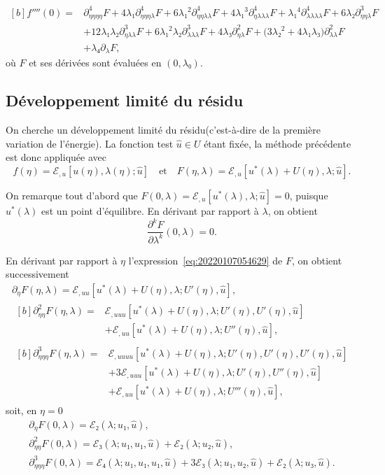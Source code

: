 \documentclass[12pt, final]{amsart}
\theoremstyle{definition}
\begin{document}
\begin{equation}
  \begin{aligned}[b]
    f''''(0) ={}
    & ∂_{ηηηη}^4F + 4 λ₁ ∂_{ηηηλ}^4 F + 6 λ₁^2 ∂_{ηηλλ}^4 F + 4 λ₁^3 ∂_{ηλλλ}^4 F + λ₁^4 ∂_{λλλλ}^4 F + 6 λ₂ ∂_{ηηλ}^3 F\\
    & + 12 λ₁ λ₂ ∂_{ηλλ}^3 F + 6 λ₁^2 λ₂ ∂_{λλλ}^3 F + 4 λ₃ ∂_{ηλ}^2 F + \bigl(3 λ₂^2 + 4 λ₁ λ₃\bigr) ∂_{λλ}^2 F \\
    & + λ₄ ∂_{λ} F,
  \end{aligned}
\end{equation}
où \(F\) et ses dérivées sont évaluées en \((0, λ₀)\).

\subsection{Développement limité du résidu}
\label{sec:20211112182000}

On cherche un développement limité du résidu(c'est-à-dire de la première
variation de l'énergie). La fonction test \(\hat{u} ∈ U\) étant fixée, la
méthode précédente est donc appliquée avec
\begin{equation}
  \label{eq:20220107054629}
  f(η) =ℰ_{, u} [u(η), λ(η); \hat{u}]
  \quad \text{et} \quad
  F(η, λ) = ℰ_{, u}[u^{\ast}(λ) + U(η), λ; \hat{u}].
\end{equation}

On remarque tout d'abord que
\(F(0, λ) =ℰ_{, u} [u^{\ast} (λ), λ; \hat{u}] = 0\), puisque \(u^{\ast}(λ)\) est
un point d'équilibre. En dérivant par rapport à \(λ\), on obtient
\begin{equation}
  \label{eq:20211112164204}
  \frac{∂^k F}{∂ λ^k}(0, λ) = 0.
\end{equation}

En dérivant par rapport à \(η\) l'expression~\eqref{eq:20220107054629} de \(F\),
on obtient successivement
\begin{gather}
  ∂_{η}F(η, λ) = ℰ_{, u u}[u^{\ast}(λ) + U(η), λ; U'(η), \hat{u}],\\
  \begin{aligned}[b]
    ∂_{η η}^2 F(η, λ) ={}
    & ℰ_{, uuu}[u^{\ast}(λ) + U(η), λ; U'(η), U'(η), \hat{u}]\\
    & + ℰ_{, uu} [u^{\ast}(λ) + U(η), λ; U''(η), \hat{u}],
  \end{aligned}\\
  \begin{aligned}[b]
    ∂_{ηηη}^3 F(η, λ) ={}
    & ℰ_{, uuuu}[u^{\ast}(λ) + U(η), λ; U'(η), U'(η), U'(η), \hat{u}]\\
    & + 3ℰ_{, u u u}[u^{\ast}(λ) + U(η), λ; U'(η), U''(η), \hat{u}]\\
    & + ℰ_{, uu}[u^{\ast}(λ) + U(η), λ; U'''(η), \hat{u}],
  \end{aligned}
\end{gather}
soit, en \(η = 0\)
\begin{gather}
  ∂_{η}F(0, λ) = ℰ₂(λ; u₁, \hat{u}),\\
  ∂_{ηη}^2 F(0, λ) = ℰ₃(λ; u₁, u₁, \hat{u}) + ℰ₂(λ; u₂, \hat{u}),\\
  ∂_{ηηη}^3 F(0, λ) = ℰ₄(λ; u₁, u₁, u₁, \hat{u}) + 3ℰ₃(λ; u₁, u₂, \hat{u}) + ℰ₂(λ; u₃, \hat{u}).
\end{gather}
\end{document}
